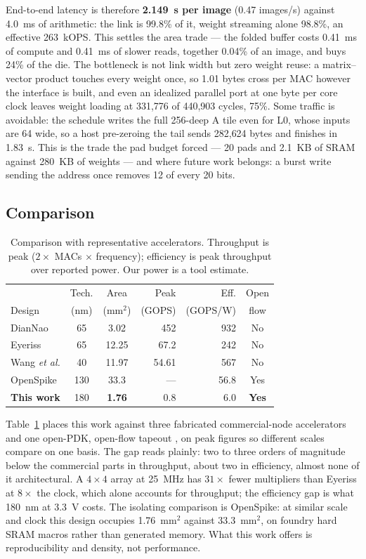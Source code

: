 \documentclass[conference,a4paper]{APSIPA2026}
\begin{document}
End-to-end latency is therefore \textbf{2.149~s per image} (0.47 images/s) against 4.0~ms of arithmetic: the link is 99.8\% of it, weight streaming alone 98.8\%, an effective 263~kOPS. This settles the area trade --- the folded buffer costs 0.41~ms of compute and 0.41~ms of slower reads, together 0.04\% of an image, and buys 24\% of the die. The bottleneck is not link width but zero weight reuse: a matrix--vector product touches every weight once, so 1.01 bytes cross per MAC however the interface is built, and even an idealized parallel port at one byte per core clock leaves weight loading at 331{,}776 of 440{,}903 cycles, 75\%. Some traffic is avoidable: the schedule writes the full 256-deep A tile even for L0, whose inputs are 64 wide, so a host pre-zeroing the tail sends 282{,}624 bytes and finishes in 1.83~s. This is the trade the pad budget forced --- 20 pads and 2.1~KB of SRAM against 280~KB of weights --- and where future work belongs: a burst write sending the address once removes 12 of every 20 bits.

\subsection{Comparison}

\begin{table}[!ht]
\caption{Comparison with representative accelerators. Throughput is peak ($2\times$ MACs $\times$ frequency); efficiency is peak throughput over reported power. Our power is a tool estimate.}
\label{tab:compare}
\centering
\small
\renewcommand{\arraystretch}{1.12}
\begin{tabular}{@{}lccrrc@{}}
\toprule
 & Tech. & Area & Peak & Eff. & Open \\
Design & (nm) & (mm$^2$) & (GOPS) & (GOPS/W) & flow \\
\midrule
DianNao \cite{diannao}   & 65  & 3.02  & 452   & 932 & No \\
Eyeriss \cite{eyeriss}   & 65  & 12.25 & 67.2  & 242 & No \\
Wang \emph{et al.} \cite{wang} & 40 & 11.97 & 54.61 & 567 & No \\
OpenSpike \cite{openspike} & 130 & 33.3 & ---   & 56.8 & Yes \\
\textbf{This work}       & 180 & \textbf{1.76} & 0.8 & 6.0 & \textbf{Yes} \\
\bottomrule
\end{tabular}
\end{table}
Table~\ref{tab:compare} places this work against three fabricated commercial-node accelerators \cite{diannao, eyeriss, wang} and one open-PDK, open-flow tapeout \cite{openspike}, on peak figures so different scales compare on one basis. The gap reads plainly: two to three orders of magnitude below the commercial parts in throughput, about two in efficiency, almost none of it architectural. A $4\times4$ array at 25~MHz has $31\times$ fewer multipliers than Eyeriss at $8\times$ the clock, which alone accounts for throughput; the efficiency gap is what 180~nm at 3.3~V costs. The isolating comparison is OpenSpike: at similar scale and clock this design occupies 1.76~mm$^2$ against 33.3~mm$^2$, on foundry hard SRAM macros rather than generated memory. What this work offers is reproducibility and density, not performance.
\end{document}
